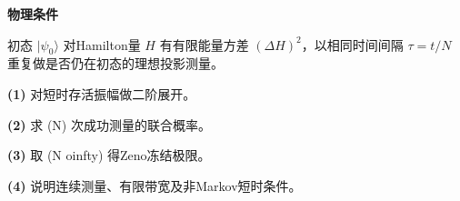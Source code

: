 \textbf{物理条件}\par 初态 \(|\psi_0\rangle\) 对Hamilton量 \(H\) 有有限能量方差 \((\Delta H)^2\)，以相同时间间隔 \(\tau=t/N\) 重复做是否仍在初态的理想投影测量。
\par\noindent\textbf{(1)} 对短时存活振幅做二阶展开。
\par\noindent\textbf{(2)} 求 (N) 次成功测量的联合概率。
\par\noindent\textbf{(3)} 取 (N	oinfty) 得Zeno冻结极限。
\par\noindent\textbf{(4)} 说明连续测量、有限带宽及非Markov短时条件。

